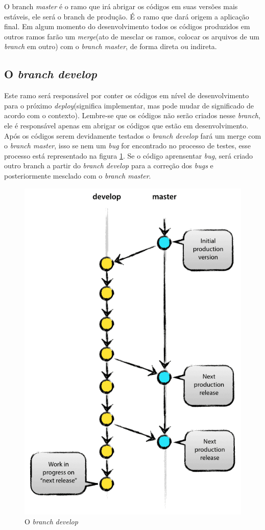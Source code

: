 \documentclass[12pt,openright,oneside,a4paper,english,brazil]{abntex2}
\begin{document}
O branch \textit{master} é o ramo que irá abrigar os códigos em suas versões mais estáveis, ele será o branch de produção. É o ramo que dará origem a aplicação final. Em algum momento do desenvolvimento todos os códigos produzidos em outros ramos farão um \textit{merge}(ato de mesclar os ramos, colocar os arquivos de um \textit{branch} em outro) com o \textit{branch master}, de forma direta ou indireta.

\subsection{O \textit{branch develop}}

Este ramo será responsável por conter os códigos em nível de desenvolvimento para o próximo \textit{deploy}(significa implementar, mas pode mudar de significado de acordo com o contexto). Lembre-se que os códigos não serão criados nesse \textit{branch}, ele é responsável apenas em abrigar os códigos que estão em desenvolvimento. Após os códigos serem devidamente testados o \textit{branch develop} fará um merge com o \textit{branch master}, isso se nem um \textit{bug} for encontrado no processo de testes, esse processo está representado na figura \ref{develop}. Se o código aprensentar \textit{bug}, será criado outro branch a partir do \textit{branch develop} para a correção dos \textit{bugs} e posteriormente mesclado com o \textit{branch master}.

\begin{figure}[h]
	\caption{\label{develop}O \textit{branch} \textit{develop}}
	\begin{center}
		\includegraphics[width=0.6\linewidth]{imagens/develop}
	\end{center}
\end{figure}
	
\end{document}
